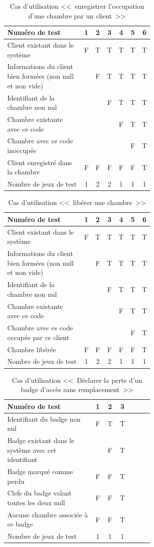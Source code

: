 \documentclass[11pt,article]{article}
\newcommand{\nullvalue}{\textsf{null}\xspace}
\begin{document}
\begin{table}[htbp!]
\begin{tabular}{|p{0.6\linewidth}|c|c|c|c|c|c|}
\hline
Numéro de test
&1&2&3&4&5&6\\
\hline
\hline
Client existant dans le système
&F&T&T&T&T&T\\
\hline
Informations du client bien formées (non \nullvalue et non vide)
& &F&T&T&T&T\\
\hline
Identifiant de la chambre non nul
& & &F&T&T&T\\
\hline
Chambre existante avec ce code
& & & &F&T&T\\
\hline
Chambre avec ce code inoccupée
& & & & &F&T\\
\hline
\hline
Client enregistré dans la chambre
&F&F&F&F&F&T\\
\hline
\hline
Nombre de jeux de test
&1&2&2&1&1&1\\
\hline
\end{tabular}
\caption{Cas d'utilisation <<~enregistrer l'occupation d'une chambre par un client~>>}
\end{table}

\begin{table}[htbp!]
\begin{tabular}{|p{0.6\linewidth}|c|c|c|c|c|c|}
\hline
Numéro de test
&1&2&3&4&5&6\\
\hline
\hline
Client existant dans le système
&F&T&T&T&T&T\\
\hline
Informations du client bien formées (non \nullvalue et non vide)
& &F&T&T&T&T\\
\hline
Identifiant de la chambre non nul
& & &F&T&T&T\\
\hline
Chambre existante avec ce code
& & & &F&T&T\\
\hline
Chambre avec ce code occupée par ce client
& & & & &F&T\\
\hline
\hline
Chambre libérée
&F&F&F&F&F&T\\
\hline
\hline
Nombre de jeux de test
&1&2&2&1&1&1\\
\hline
\end{tabular}
\caption{Cas d'utilisation <<~libérer une chambre~>>}
\end{table}
\newpage

\begin{table}[htbp!]
\begin{tabular}{|p{0.6\linewidth}|c|c|c|c|c|c|}
\hline
Numéro de test
&1&2&3\\
\hline
\hline
Identifiant du badge non nul
&F&T&T\\
\hline
Badge existant dans le système avec cet identifiant
& &F&T\\
\hline
\hline
Badge marqué comme perdu
&F&F&T\\
\hline
Clefs du badge valant toutes les deux \nullvalue
&F&F&T\\
\hline
Aucune chambre associée à ce badge
&F&F&T\\
\hline
\hline
Nombre de jeux de test
&1&1&1\\
\hline
\end{tabular}
\caption{Cas d'utilisation <<~Déclarer la perte d'un badge d'accès sans remplacement~>>}
\end{table}
\newpage
\end{document}
